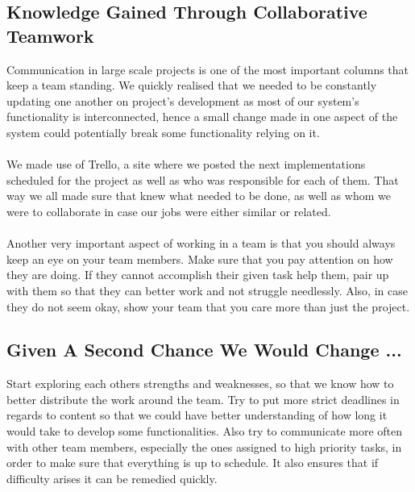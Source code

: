 \documentclass[11pt,a4paper]{article}
\begin{document}
        \subsection{Knowledge Gained Through Collaborative Teamwork}
        Communication in large scale projects is one of the most important columns that keep a team standing. We quickly realised that we needed to be constantly updating one another on project's development as most of our system's functionality is interconnected, hence a small change made in one aspect of the system could potentially break some functionality relying on it.\\\\
        We made use of Trello, a site where we posted the next implementations scheduled for the project as well as who was responsible for each of them. That way we all made sure that knew what needed to be done, as well as whom we were to collaborate in case our jobs were either similar or related.\\\\
        Another very important aspect of working in a team is that you should always keep an eye on your team members. Make sure that you pay attention on how they are doing. If they cannot accomplish their given task help them, pair up with them so that they can better work and not struggle needlessly. Also, in case they do not seem okay, show your team that you care more than just the project.
         

        \subsection{Given A Second Chance We Would Change ...}
        Start exploring each others strengths and weaknesses, so that we know how to better distribute the work around the team. Try to put more strict deadlines in regards to content so that we could have better understanding of how long it would take to develop some functionalities. 
        Also try to communicate more often with other team members, especially the ones assigned to high priority tasks, in order to make sure that everything is up to schedule. It also ensures that if difficulty arises it can be remedied quickly.
\end{document}
